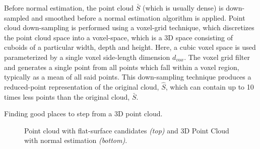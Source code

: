 			Before normal estimation, the point cloud $\bar{S}$ (which is usually dense) is down-sampled and smoothed before a normal estimation algorithm is applied. Point cloud down-sampling is performed using a voxel-grid technique, which discretizes the point cloud space into a voxel-space, which is a 3D space consisting of cuboids of a particular width, depth and height. Here, a cubic voxel space is used parameterized by a single voxel side-length dimension $d_{vox}$. The voxel grid filter and generates a single point from all points which fall within a voxel region, typically as a mean of all said points. This down-sampling technique produces a reduced-point representation of the original cloud, $\hat{S}$, which can contain up to 10 times less points than the original cloud, $\bar{S}$.
			\begin{algorithm}[!h]
				\begin{algorithmic}
						\EndIf
					\EndFor
				\end{algorithmic}	
				\caption{Finding good places to step from a 3D point cloud.}
				\label{alg::goodspacestostep}
			\end{algorithm}

			\begin{figure}[h!]
				\centering
				\caption{Point cloud with flat-surface candidates \emph{(top)} and 3D Point Cloud with normal estimation \emph{(bottom)}.}
				\label{fig::surface_estimation}
			\end{figure}